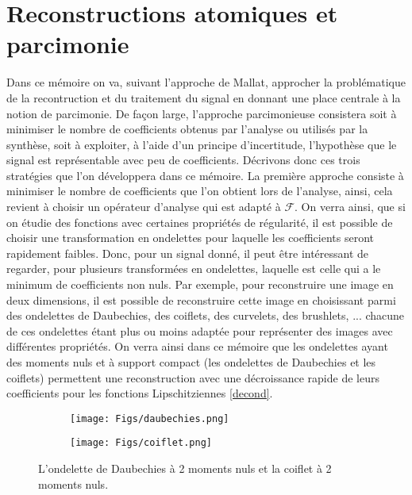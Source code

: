 \section{Reconstructions atomiques et parcimonie}
Dans ce mémoire on va, suivant l'approche de Mallat, approcher la problématique de la recontruction et du traitement du signal en donnant une place centrale à la notion de parcimonie.
De façon large, l'approche parcimonieuse consistera soit à minimiser le nombre de coefficients obtenus par l'analyse ou utilisés par la synthèse, soit à exploiter, à l'aide d'un principe d'incertitude, l'hypothèse que le signal est représentable avec peu de coefficients.
Décrivons donc ces trois stratégies que l'on développera dans ce mémoire.
\newline 
La première approche consiste à minimiser le nombre de coefficients que l'on obtient lors de l'analyse, ainsi, cela revient à choisir un opérateur d'analyse qui est adapté à $\mathcal{F}$.
On verra ainsi, que si on étudie des fonctions avec certaines propriétés de régularité, il est possible de choisir une transformation en ondelettes pour laquelle les coefficients seront rapidement faibles. 
Donc, pour un signal donné, il peut être intéressant de regarder, pour plusieurs transformées en ondelettes, laquelle est celle qui a le minimum de coefficients non nuls.
Par exemple, pour reconstruire une image en deux dimensions, il est possible de reconstruire cette image en choisissant parmi des ondelettes de Daubechies, des coiflets, des curvelets, des brushlets, ...
chacune de ces ondelettes étant plus ou moins adaptée pour représenter des images avec différentes propriétés.
On verra ainsi dans ce mémoire que les ondelettes ayant des moments nuls et à support compact (les ondelettes de Daubechies et les coiflets) permettent une reconstruction avec une décroissance rapide de leurs coefficients pour les fonctions Lipschitziennes \ref{decond}.

\begin{figure}[h]%
\centering
\begin{subfigure}{.5\textwidth}
  \centering
  \texttt{[image: Figs/daubechies.png]}
  \label{fig:sub1}
\end{subfigure}%
\begin{subfigure}{.5\textwidth}
  \centering
  \texttt{[image: Figs/coiflet.png]}
  \label{fig:sub2}
\end{subfigure}
	\caption{L'ondelette de Daubechies à 2 moments nuls et la coiflet à 2 moments nuls.}
\label{fig:test}
\end{figure}

